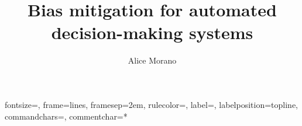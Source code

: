 \documentclass[twoside]{um}  %
\title{Bias mitigation for automated decision-making systems}  %
\author{Alice Morano}                           %
\begin{document}
\frontmatter 
    \maketitle
           
        
    \if@openright\cleardoublepage\else\clearpage\fi   %
    \tableofcontents*\if@openright\cleardoublepage\else\clearpage\fi
    \listoffigures*\if@openright\cleardoublepage\else\clearpage\fi
    \listoftables*\if@openright\cleardoublepage\else\clearpage\fi
{}%
{fontsize=\footnotesize,
 frame=lines,  %
 framesep=2em, %
 rulecolor=\color{#000000},
 label=,
 labelposition=topline,
 commandchars=\|\(\), %
 commentchar=*        %
}



\pagestyle{umpage}
\mainmatter 
     
    
    
    
    
    
    \appendix
        \label{appB}    

{\backmatter
    \if@openright\cleardoublepage\else\clearpage\fi
    {\footnotesize}
	\printindex
}
\end{document}
